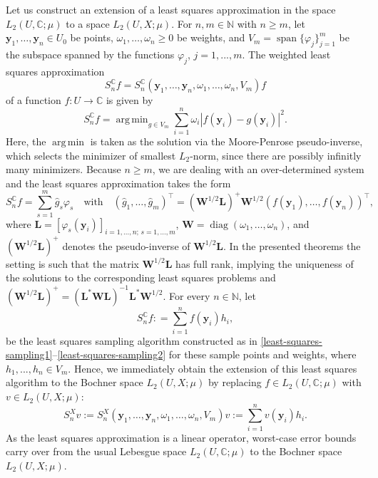 \documentclass[11pt]{article}
\numberwithin{equation}{section}
\theoremstyle{definition}
\theoremstyle{remark}
\newcommand{\by}{{\boldsymbol{y}}}
\def\NN{{\mathbb N}}
\def\CC{{\mathbb C}}
\def\CC{{\mathbb C}}
\def\NN{{\mathbb N}}
\def\CC{{\mathbb C}}
\def\NN{{\mathbb N}}
\begin{document}
Let us construct an extension of a least squares approximation in the space $L_2(U,\CC;\mu)$ to a space $L_2(U,X;\mu)$.
{For $n,m\in\NN$ with $n\ge m$}, let $\by_1, \dots, \by_{{n}}\in U_0$ be points, $\omega_1, \dots, \omega_{{n}}\ge 0$ be weights, and $V_m = \operatorname{span}\{\varphi_j\}_{j=1}^{m}$ be the subspace spanned by the functions $\varphi_j$, $j=1,...,m$.
The weighted least squares approximation 
$$
S_{{n}}^{\CC} f 
= 
S_{{n}}^{\CC}(\by_1, \dots, \by_{{n}}, \omega_1, \dots, \omega_{{n}}, V_m) f
$$ 
of a function $f\colon U\to\CC$ is given by
\begin{equation} \label{least-squares-sampling1}
	S_{{n}}^{\CC} f
	= \operatorname{arg\,min}_{g\in V_m} \sum_{i=1}^{{n}} \omega_i |f(\by_i) - g(\by_i)|^2 .
\end{equation}
Here, the $\operatorname{arg\,min}$ is taken as the solution via the Moore-Penrose pseudo-inverse, which selects the minimizer of smallest $L_2$-norm, since there are possibly infinitly many minimizers.
Because $n\ge m$, we are dealing with an over-determined system and the least squares approximation takes the form
\begin{equation} \label{least-squares-sampling2}
	S_{{n}}^\CC f
	= \sum_{s=1}^{m} \hat g_{s} \varphi_s
	\quad\text{with}\quad
	(\hat g_1, \dots, \hat g_{m})^\top
    = (\boldsymbol W^{1/2}\boldsymbol L)^{+} \boldsymbol W^{1/2} (f(\by_1), \dots, f(\by_{{n}}))^{\top},
\end{equation} 
where
 $\boldsymbol L = [\varphi_s(\by_i)]_{i=1,\dots,{n}; \, s=1,\dots,m}$, {$\boldsymbol W = \operatorname{diag}(\omega_1, \dots, \omega_n)$}, and $(\boldsymbol W^{1/2}\boldsymbol L)^{+}$ denotes the pseudo-inverse of $\boldsymbol W^{1/2}\boldsymbol L$.
In the presented theorems the setting is such that the matrix $\boldsymbol W^{1/2}\boldsymbol L$ has full rank, implying the uniqueness of the solutions to the corresponding least squares problems and $(\boldsymbol W^{1/2}\boldsymbol L)^{+} = (\boldsymbol L^\ast\boldsymbol W\boldsymbol L)^{-1}\boldsymbol L^\ast\boldsymbol W^{1/2}$.
For every $n \in \NN$, let
\begin{equation} \label{S_nCC}
	S_{{n}}^\CC f : = \sum_{i=1}^{{n}} f(\by_i) {h_i},
\end{equation}	
be the least squares sampling algorithm constructed as in 
\eqref{least-squares-sampling1}--\eqref{least-squares-sampling2} for these sample points and weights, where 
$h_1,...,h_{{n}} \in V_m$.
Hence, we immediately obtain the extension of this least squares algorithm to the Bochner space $L_2(U,X;\mu)$
by replacing $f\in L_2(U,\CC;\mu)$ with $v\in L_2(U,X;\mu)$:
\begin{equation} \label{S_nX}
	S_{{n}}^X v
	:=
	S_{{n}}^X(\by_1, \dots, \by_{{n}}, \omega_1, \dots, \omega_{{n}}, V_m) v
	:= \sum_{i=1}^{{n}} v(\by_i) h_i.
\end{equation}
As the least squares approximation is a linear operator, worst-case error bounds carry over from the usual Lebesgue space $L_2(U,\CC;\mu)$ to the Bochner space $L_2(U,X;\mu)$.
\end{document}
